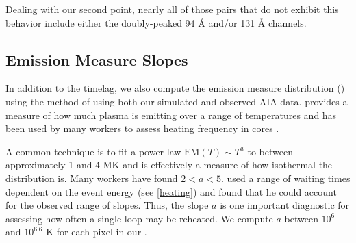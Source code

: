 Dealing with our second point, nearly all of those pairs that do not exhibit this behavior include either the doubly-peaked 94 \AA{} and/or 131 \AA{} channels. 




\subsection{Emission Measure Slopes}

In addition to the timelag, we also compute the emission measure distribution (\dem) using the method of \citet{hannah_differential_2012} using both our simulated and observed AIA data. \dem provides a measure of how much plasma is emitting over a range of temperatures and has been used by many workers to assess heating frequency in \AR{} cores \citep[][and references therein]{tripathi_emission_2011,warren_constraints_2011,warren_systematic_2012,schmelz_cold_2012,bradshaw_diagnosing_2012,reep_diagnosing_2013,barnes_inference_2016,barnes_inference_2016,barnes_inference_2016-1}. 

A common technique is to fit a power-law $\mathrm{EM}(T)\sim T^a$ to \dem between approximately 1 and 4 MK and is effectively a measure of how isothermal the distribution is. Many workers \citep[see Table 3 of][and references therein]{bradshaw_diagnosing_2012} have found $2<a<5$. \citet{cargill_active_2014} used a range of waiting times dependent on the event energy (see \autoref{heating}) and found that he could account for the observed range of slopes. Thus, the \dem slope $a$ is one important diagnostic for assessing how often a single loop may be reheated. We compute $a$ between $10^6$ and $10^{6.6}$ K for each pixel in our \AR{}.
